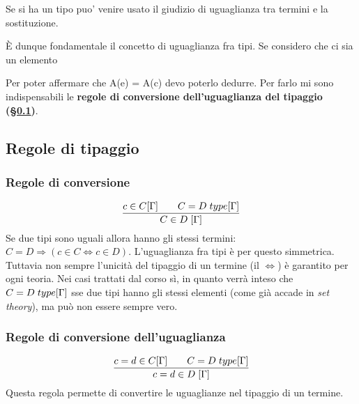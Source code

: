 \documentclass[10pt,a4paper, italian]{book}
\begin{document}
{{{\begin{prooftree}
\end{prooftree}
Se si ha un tipo puo' venire usato il giudizio di uguaglianza tra termini e la sostituzione.
\begin{prooftree}
\end{prooftree}
\noindent
\`E dunque fondamentale il concetto di uguaglianza fra tipi. Se considero che ci sia un elemento

\begin{prooftree}
\end{prooftree}
\noindent
Per poter affermare che A(e) = A(c) devo poterlo dedurre. Per farlo mi sono indispensabili le \textbf{regole di conversione dell'uguaglianza del tipaggio (\S\ref{subsec:regole-tipaggio})}.

\subsection{Regole di tipaggio}
\label{subsec:regole-tipaggio}

\subsubsection{Regole di conversione}
\label{subsubsec:regole-di-conversione}
\[\frac{c \in C[\Gamma] \qquad C = D\hspace{0.1cm}type[\Gamma]}{C \in D\hspace{0.1cm}[\Gamma]}\]
Se due tipi sono uguali allora hanno gli stessi termini: $C=D \Rightarrow (c \in C \Leftrightarrow c \in D)$. L'uguaglianza fra tipi \`e per questo simmetrica.\\
Tuttavia non sempre l'unicit\`a del tipaggio di un termine (il $\Leftrightarrow$) \`e garantito per ogni teoria. Nei casi trattati dal corso s\`i, in quanto verr\`a inteso che $C = D\hspace{0.1cm}type[\Gamma]$ sse due tipi hanno gli stessi elementi (come gi\`a accade in \textit{set theory}), ma pu\`o non essere sempre vero.

\subsubsection{Regole di conversione dell'uguaglianza}
\label{subsubsec:regole-di-conversione-uguaglianza}
\[\frac{c=d \in C[\Gamma] \qquad C = D\hspace{0.1cm}type[\Gamma]}{c = d \in D \hspace{0.1cm} [\Gamma]}\]
Questa regola permette di convertire le uguaglianze nel tipaggio di un termine.


}}}
\end{document}
